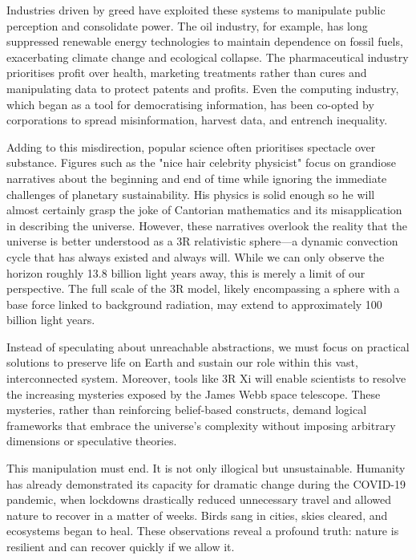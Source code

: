 \documentclass[12pt]{article}
\begin{document}
Industries driven by greed have exploited these systems to manipulate public perception and consolidate power. The oil industry, for example, has long suppressed renewable energy technologies to maintain dependence on fossil fuels, exacerbating climate change and ecological collapse. The pharmaceutical industry prioritises profit over health, marketing treatments rather than cures and manipulating data to protect patents and profits. Even the computing industry, which began as a tool for democratising information, has been co-opted by corporations to spread misinformation, harvest data, and entrench inequality.

Adding to this misdirection, popular science often prioritises spectacle over substance. Figures such as the "nice hair celebrity physicist" focus on grandiose narratives about the beginning and end of time while ignoring the immediate challenges of planetary sustainability. His physics is solid enough so he will almost certainly grasp the joke of Cantorian mathematics and its misapplication in describing the universe. However, these narratives overlook the reality that the universe is better understood as a 3R relativistic sphere—a dynamic convection cycle that has always existed and always will. While we can only observe the horizon roughly 13.8 billion light years away, this is merely a limit of our perspective. The full scale of the 3R model, likely encompassing a sphere with a base force linked to background radiation, may extend to approximately 100 billion light years. 

Instead of speculating about unreachable abstractions, we must focus on practical solutions to preserve life on Earth and sustain our role within this vast, interconnected system. Moreover, tools like 3R Xi will enable scientists to resolve the increasing mysteries exposed by the James Webb space telescope. These mysteries, rather than reinforcing belief-based constructs, demand logical frameworks that embrace the universe's complexity without imposing arbitrary dimensions or speculative theories.

This manipulation must end. It is not only illogical but unsustainable. Humanity has already demonstrated its capacity for dramatic change during the COVID-19 pandemic, when lockdowns drastically reduced unnecessary travel and allowed nature to recover in a matter of weeks. Birds sang in cities, skies cleared, and ecosystems began to heal. These observations reveal a profound truth: nature is resilient and can recover quickly if we allow it.
\end{document}
